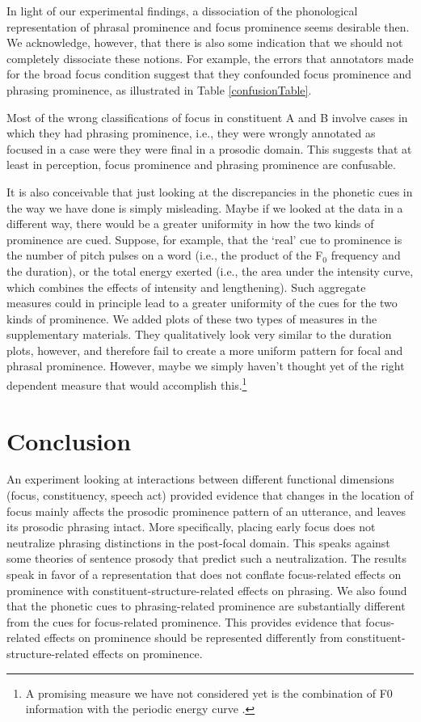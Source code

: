 \documentclass[preprint,review,12pt,authoryear,times]{elsarticle}
\begin{document}
In light of our experimental findings, a dissociation of the phonological representation of phrasal prominence and focus prominence seems desirable then. We acknowledge, however, that there is also some indication that we should not completely dissociate these notions. For example, the errors that annotators made for the broad focus condition suggest that they confounded focus prominence and phrasing prominence, as illustrated in Table \ref{confusionTable}.

 

Most of the wrong classifications of focus in constituent A and B involve cases in which they had phrasing prominence, i.e., they were wrongly annotated as focused in a case were they were final in a prosodic domain. This suggests that at least in perception, focus prominence and phrasing prominence are confusable. 

It is also conceivable that just looking at the discrepancies in the phonetic cues in the way we have done is simply misleading. Maybe if we looked at the data in a different way, there would be a greater uniformity in how the two kinds of prominence are cued. Suppose, for example, that the `real' cue to prominence is the number of pitch pulses on a word (i.e., the product of the F$_0$  frequency and the duration), or the total energy exerted (i.e., the area under the intensity curve, which combines the effects of intensity and lengthening). Such aggregate measures could in principle lead to a greater uniformity of the cues for the two kinds of prominence. We added plots of these two types of measures in the supplementary materials. They qualitatively look very similar to the duration plots, however, and therefore fail to create a more uniform pattern for focal and phrasal prominence. However, maybe we simply haven't thought yet of the right dependent measure that would accomplish this.\footnote{A promising measure we have not considered yet is the combination of F0 information with the periodic energy curve  \citep{alber18,cange19}.}

\section{Conclusion}

An experiment looking at interactions between different functional dimensions (focus, constituency, speech act) provided evidence that changes in the location of focus mainly affects the prosodic prominence pattern of an utterance, and leaves its prosodic phrasing intact. More specifically, placing early focus does not neutralize phrasing distinctions in the post-focal domain. This speaks against some theories of sentence prosody that predict such a neutralization. The results speak in favor of a representation that does not conflate focus-related effects on prominence with constituent-structure-related effects on phrasing. We also found that the phonetic cues to phrasing-related prominence are substantially different from the cues for focus-related prominence. This provides evidence that focus-related effects on prominence should be represented differently from constituent-structure-related effects on prominence. 
\end{document}
